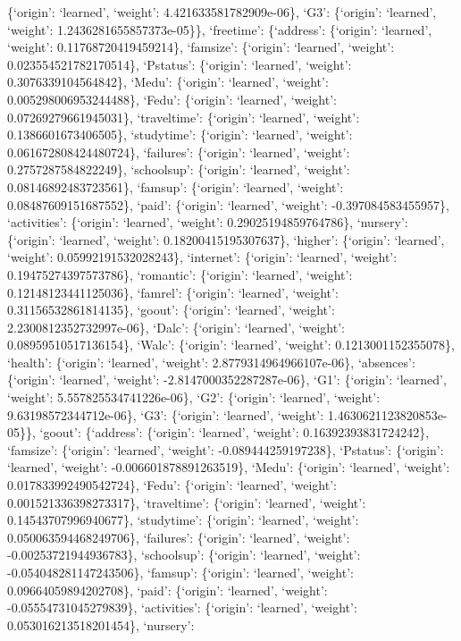 \documentclass[
]{article}
\begin{document}
\{`origin': `learned', `weight': 4.421633581782909e-06\}, `G3':
\{`origin': `learned', `weight': 1.2436281655857373e-05\}\}, `freetime':
\{`address': \{`origin': `learned', `weight': 0.11768720419459214\},
`famsize': \{`origin': `learned', `weight': 0.023554521782170514\},
`Pstatus': \{`origin': `learned', `weight': 0.3076339104564842\},
`Medu': \{`origin': `learned', `weight': 0.005298006953244488\}, `Fedu':
\{`origin': `learned', `weight': 0.07269279661945031\}, `traveltime':
\{`origin': `learned', `weight': 0.1386601673406505\}, `studytime':
\{`origin': `learned', `weight': 0.061672808424480724\}, `failures':
\{`origin': `learned', `weight': 0.2757287584822249\}, `schoolsup':
\{`origin': `learned', `weight': 0.08146892483723561\}, `famsup':
\{`origin': `learned', `weight': 0.08487609151687552\}, `paid':
\{`origin': `learned', `weight': -0.397084583455957\}, `activities':
\{`origin': `learned', `weight': 0.29025194859764786\}, `nursery':
\{`origin': `learned', `weight': 0.18200415195307637\}, `higher':
\{`origin': `learned', `weight': 0.05992191532028243\}, `internet':
\{`origin': `learned', `weight': 0.19475274397573786\}, `romantic':
\{`origin': `learned', `weight': 0.12148123441125036\}, `famrel':
\{`origin': `learned', `weight': 0.31156532861814135\}, `goout':
\{`origin': `learned', `weight': 2.2300812352732997e-06\}, `Dalc':
\{`origin': `learned', `weight': 0.08959510517136154\}, `Walc':
\{`origin': `learned', `weight': 0.1213001152355078\}, `health':
\{`origin': `learned', `weight': 2.8779314964966107e-06\}, `absences':
\{`origin': `learned', `weight': -2.8147000352287287e-06\}, `G1':
\{`origin': `learned', `weight': 5.557825534741226e-06\}, `G2':
\{`origin': `learned', `weight': 9.63198572344712e-06\}, `G3':
\{`origin': `learned', `weight': 1.4630621123820853e-05\}\}, `goout':
\{`address': \{`origin': `learned', `weight': 0.16392393831724242\},
`famsize': \{`origin': `learned', `weight': -0.089444259197238\},
`Pstatus': \{`origin': `learned', `weight': -0.006601878891263519\},
`Medu': \{`origin': `learned', `weight': 0.017833992490542724\}, `Fedu':
\{`origin': `learned', `weight': 0.001521336398273317\}, `traveltime':
\{`origin': `learned', `weight': 0.14543707996940677\}, `studytime':
\{`origin': `learned', `weight': 0.050063594468249706\}, `failures':
\{`origin': `learned', `weight': -0.00253721944936783\}, `schoolsup':
\{`origin': `learned', `weight': -0.054048281147243506\}, `famsup':
\{`origin': `learned', `weight': 0.09664059894202708\}, `paid':
\{`origin': `learned', `weight': -0.05554731045279839\}, `activities':
\{`origin': `learned', `weight': 0.053016213518201454\}, `nursery':
\end{document}
